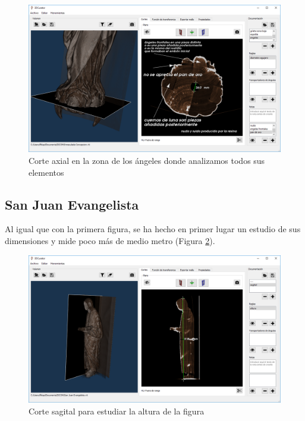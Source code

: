 \begin{figure}[H]
	\centering
	\includegraphics[width=12.5cm]{imagenes/resultados/documentacion/inmaculada-concepcion/angeles}
	\caption{Corte axial en la zona de los ángeles donde analizamos todos sus elementos}
	\label{fig:resultados/documentacion/inmaculada-concepcion/angeles}
\end{figure}

\subsection{San Juan Evangelista}

Al igual que con la primera figura, se ha hecho en primer lugar un estudio de sus dimensiones y mide poco más de medio metro (Figura \ref{fig:resultados/documentacion/san-juan-evangelista/sagital}). 

\begin{figure}[H]
	\centering
	\includegraphics[width=12.5cm]{imagenes/resultados/documentacion/san-juan-evangelista/sagital}
	\caption{Corte sagital para estudiar la altura de la figura}
	\label{fig:resultados/documentacion/san-juan-evangelista/sagital}
\end{figure}

